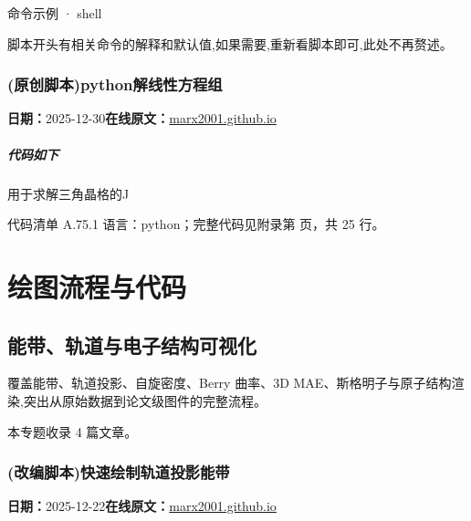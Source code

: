 \documentclass[lang=cn,scheme=chinese,color=blue,device=normal,toc=onecol,math=cm]{elegantbook}
\begin{document}
\begin{inlinecodebox}{命令示例 · shell}
\end{inlinecodebox}


脚本开头有相关命令的解释和默认值,如果需要,重新看脚本即可,此处不再赘述。\par



\section{(原创脚本)python解线性方程组}
\begin{articlemeta}
\textbf{日期：}2025-12-30\hfill\textbf{在线原文：}\href{https://marx2001.github.io/sci-note\_posts/20251230-linear}{marx2001.github.io}
\end{articlemeta}

\subsubsection{代码如下}


用于求解三角晶格的J\par


\begin{codeindexbox}{代码清单 A.75.1}
语言：python；完整代码见附录第 \pageref{code:75:1} 页，共 25 行。
\end{codeindexbox}


\part{绘图流程与代码}
\chapter{能带、轨道与电子结构可视化}
\begin{partbox}覆盖能带、轨道投影、自旋密度、Berry 曲率、3D MAE、斯格明子与原子结构渲染,突出从原始数据到论文级图件的完整流程。\par\medskip 本专题收录 4 篇文章。\end{partbox}

\section{(改编脚本)快速绘制轨道投影能带}
\begin{articlemeta}
\textbf{日期：}2025-12-22\hfill\textbf{在线原文：}\href{https://marx2001.github.io/sci-note\_posts/20251222-band}{marx2001.github.io}
\end{articlemeta}
\end{document}
